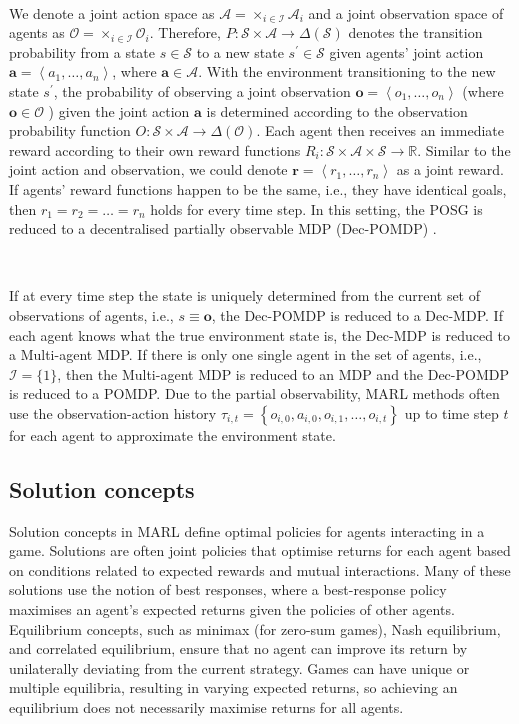 \documentclass{article}
\begin{document}
\

We denote a joint action space as $\mathcal{A}=\times_{i \in \mathcal{I}} \mathcal{A}_i$ and a joint observation space of agents as $\mathcal{O}=\times_{i \in \mathcal{I}} \mathcal{O}_i$. Therefore, $P: \mathcal{S} \times \mathcal{A} \rightarrow \Delta(\mathcal{S})$ denotes the transition probability from a state $s \in \mathcal{S}$ to a new state $s^{\prime} \in \mathcal{S}$ given agents' joint action $\mathbf{a}=\left\langle a_1, \ldots, a_n\right\rangle$, where $\mathbf{a} \in \mathcal{A}$. With the environment transitioning to the new state $s^{\prime}$, the probability of observing a joint observation $\mathbf{o}=\left\langle o_1, \ldots, o_n\right\rangle$ (where $\mathbf{o} \in \mathcal{O}$ ) given the joint action $\mathbf{a}$ is determined according to the observation probability function $O: \mathcal{S} \times \mathcal{A} \rightarrow \Delta(\mathcal{O})$. Each agent then receives an immediate reward according to their own reward functions $R_i: \mathcal{S} \times \mathcal{A} \times \mathcal{S} \rightarrow \mathbb{R}$. Similar to the joint action and observation, we could denote $\mathbf{r}=\left\langle r_1, \ldots, r_n\right\rangle$ as a joint reward. If agents' reward functions happen to be the same, i.e., they have identical goals, then $r_1=r_2=\ldots=r_n$ holds for every time step. In this setting, the POSG is reduced to a decentralised partially observable MDP (Dec-POMDP) \citep{oliehoek2016concise}. 

\

If at every time step the state is uniquely determined from the current set of observations of agents, i.e., $s \equiv \mathbf{o}$, the Dec-POMDP is reduced to a Dec-MDP. If each agent knows what the true environment state is, the Dec-MDP is reduced to a Multi-agent MDP. If there is only one single agent in the set of agents, i.e., $\mathcal{I}=\{1\}$, then the Multi-agent MDP is reduced to an MDP and the Dec-POMDP is reduced to a POMDP. Due to the partial observability, MARL methods often use the observation-action history $\tau_{i, t}=\left\{o_{i, 0}, a_{i, 0}, o_{i, 1}, \ldots, o_{i, t}\right\}$ up to time step $t$ for each agent to approximate the environment state.

\subsection{Solution concepts}\label{sec:solution_concepts}

Solution concepts in MARL define optimal policies for agents interacting in a game. Solutions are often joint policies that optimise returns for each agent based on conditions related to expected rewards and mutual interactions. Many of these solutions use the notion of best responses, where a best-response policy maximises an agent's expected returns given the policies of other agents. \citep{albrecht2024marl}Equilibrium concepts, such as minimax (for zero-sum games), Nash equilibrium, and correlated equilibrium, ensure that no agent can improve its return by unilaterally deviating from the current strategy. Games can have unique or multiple equilibria, resulting in varying expected returns, so achieving an equilibrium does not necessarily maximise returns for all agents. 
\end{document}
